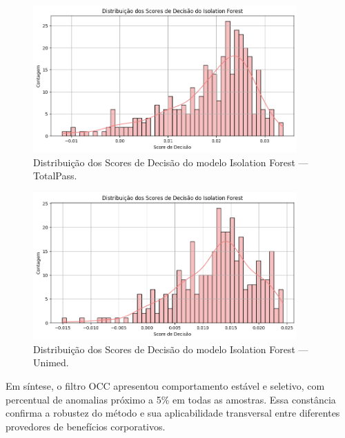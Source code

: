 \begin{figure}[H]
    \centering
    \includegraphics[width=0.9\textwidth]{imagens/totalpass_iso_forest.png}
    \caption{Distribuição dos Scores de Decisão do modelo Isolation Forest — TotalPass.}
    \label{fig:totalpass_iso_forest}
\end{figure}

\begin{figure}[H]
    \centering
    \includegraphics[width=0.9\textwidth]{imagens/unimed_iso_forest.png}
    \caption{Distribuição dos Scores de Decisão do modelo Isolation Forest — Unimed.}
    \label{fig:unimed_iso_forest}
\end{figure}


Em síntese, o filtro OCC apresentou comportamento estável e seletivo, com percentual de anomalias próximo a 5\% em todas as amostras. Essa constância confirma a robustez do método e sua aplicabilidade transversal entre diferentes provedores de benefícios corporativos.


